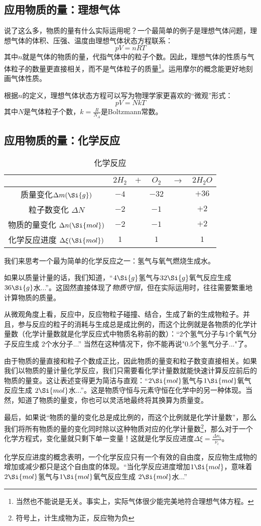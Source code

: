 \subsection{应用物质的量：理想气体}
说了这么多，物质的量有什么实际运用呢？一个最简单的例子是理想气体问题，理想气体的体积、压强、温度由理想气体状态方程联系：
$$pV=nRT$$
其中$n$就是气体的物质的量，代指气体中的粒子个数。因此，理想气体的性质与气体粒子的数量更直接相关，而不是气体粒子的质量\footnote{当然也不能说是无关。事实上，实际气体很少能完美地符合理想气体方程。}。运用摩尔的概念能更好地刻画气体性质。

根据$n$的定义，理想气体状态方程可以写为物理学家更喜欢的“微观”形式：
$$pV=NkT$$
其中$N$是气体粒子个数，$k=\frac{R}{N_A}$是Boltzmann常数。

\subsection{应用物质的量：化学反应}
\begin{table}[ht]
\centering
\caption{化学反应}\label{MOLE_tab1}
\begin{tabular}{|c|c|c|c|c|c|}
\hline
 & $2H_2$ & $+$ & $O_2$ & $\rightarrow$ & $2H_2O$ \\
\hline
质量变化$\Delta m (\Si{g})$ & $-4$ & & $-32$ & & $+36$ \\
\hline
粒子数变化 $\Delta N$ & $-2$ &  & $-1$ & & $+2$ \\
\hline
物质的量变化 $\Delta n (\Si{mol})$ & $-2$ &  & $-1$ & & $+2$ \\
\hline
化学反应进度 $\Delta \xi (\Si{mol})$ & $1$ & & $1$ & & $1$ \\
\hline
\end{tabular}
\end{table}
我们来思考一个最为简单的化学反应之一：氢气与氧气燃烧生成水。

如果以质量计量的话，我们知道，“$4\Si{g}$氢气与$32\Si{g}$氧气反应生成 $36\Si{g}$水...”。这固然直接体现了\textsl{物质守恒}，但在实际运用时，往往需要繁重地计算物质的质量。

从微观角度上看，反应中，反应物粒子碰撞、结合，生成了新的生成物粒子。并且，参与反应的粒子的消耗与生成总是成比例的，而这个比例就是各物质的化学计量数（化学计量数就是化学反应式中物质名称前的数）：“$2$个氢气分子与$1$个氧气分子反应生成 $2$个水分子...” 当然在这种情况下，你不能再说"$0.5$个氢气分子..."了。

由于物质的量直接和粒子个数成正比，因此物质的量变和粒子数变直接相关。如果我们以物质的量计量化学反应，我们只需要看化学计量数就能快速计算反应前后的物质的量变。这让表述变得更为简洁与直观：“$2\Si{mol}$氢气与$1\Si{mol}$氧气反应生成 $2\Si{mol}$水...”。这是物质守恒与元素守恒在化学中的另一种体现。当然，知道了物质的量变，你也可以灵活地最终将其换算为质量变。

最后，如果说“物质的量的变化总是成比例的，而这个比例就是化学计量数”，那么我们将所有物质的量的变化同时除以这种物质对应的化学计量数\footnote{符号上，计生成物为正，反应物为负}，那么对于一个化学方程式，变化量就只剩下单一变量！这就是化学反应进度$\Delta \xi = \frac{\Delta n_i}{\nu_i}$。

化学反应进度的概念表明，一个化学反应只有一个有效的自由度，反应物生成物的增加或减少都只是这个自由度的体现。“当化学反应进度增加$1\Si{mol}$，意味着$2\Si{mol}$氢气与$1\Si{mol}$氧气反应生成 $2\Si{mol}$水...”

